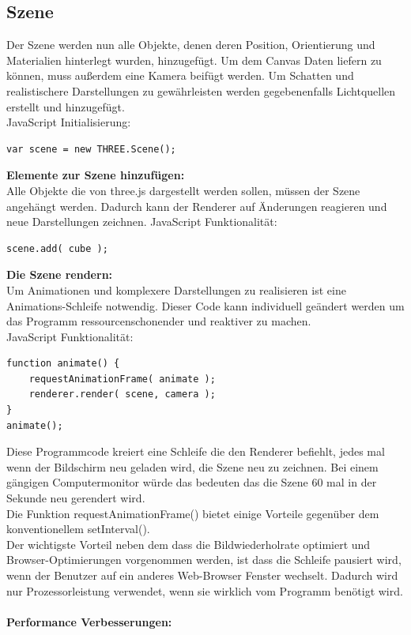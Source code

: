\subsection{Szene}
Der Szene werden nun alle Objekte, denen deren Position, Orientierung und Materialien hinterlegt wurden, hinzugefügt. Um dem Canvas Daten liefern zu können, muss außerdem eine Kamera beifügt werden. Um Schatten und realistischere Darstellungen zu gewährleisten werden gegebenenfalls Lichtquellen erstellt und hinzugefügt. 
\cite{Szenengraph}
\\
JavaScript Initialisierung:
\begin{lstlisting}
var scene = new THREE.Scene();
\end{lstlisting}
\textbf{Elemente zur Szene hinzufügen:}\\
Alle Objekte die von three.js dargestellt werden sollen, müssen der Szene angehängt werden. Dadurch kann der Renderer auf Änderungen reagieren und neue Darstellungen zeichnen.
JavaScript Funktionalität:
\begin{lstlisting}
scene.add( cube );
\end{lstlisting}
\textbf{Die Szene rendern:}\\
Um Animationen und komplexere Darstellungen zu realisieren ist eine Animations-Schleife notwendig. Dieser Code kann individuell geändert werden um das Programm ressourcenschonender und reaktiver zu machen.\\
JavaScript Funktionalität: 
\begin{lstlisting}
function animate() {
    requestAnimationFrame( animate );
    renderer.render( scene, camera );
}
animate();
\end{lstlisting}
Diese Programmcode kreiert eine Schleife die den Renderer befiehlt, jedes mal wenn der Bildschirm neu geladen wird, die Szene neu zu zeichnen. Bei einem gängigen Computermonitor würde das bedeuten das die Szene 60 mal in der Sekunde neu gerendert wird. \\
Die Funktion requestAnimationFrame() bietet einige Vorteile gegenüber dem konventionellem setInterval(). \\
Der wichtigste Vorteil neben dem dass die Bildwiederholrate optimiert und Browser-Optimierungen vorgenommen werden, ist dass die Schleife pausiert wird, wenn der Benutzer auf ein anderes Web-Browser Fenster wechselt. Dadurch wird nur Prozessorleistung verwendet, wenn sie wirklich vom Programm benötigt wird. \cite{rendering_the_scene}
\\
\\
\textbf{Performance Verbesserungen:}\\
